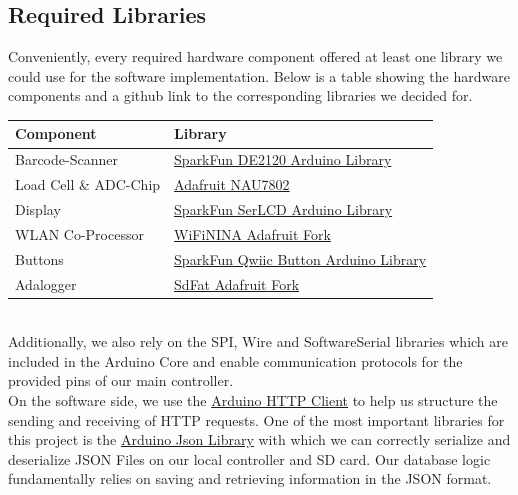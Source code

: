\documentclass{article}
\begin{document}
\subsection{Required Libraries}
Conveniently, every required hardware component offered at least one library we could use for the software implementation. 
Below is a table showing the hardware components and a github link to the corresponding libraries we decided for.
\\[10pt]
\begin{tabular}{l l}
	\hline
	Component              & Library\\
	\hline
	Barcode-Scanner        & \href{https://github.com/sparkfun/SparkFun_DE2120_Arduino_Library}{SparkFun DE2120 Arduino Library}\\
	Load Cell \& ADC-Chip  & \href{https://github.com/adafruit/Adafruit_NAU7802}{Adafruit NAU7802}\\
	Display                & \href{https://github.com/sparkfun/SparkFun_SerLCD_Arduino_Library}{SparkFun SerLCD Arduino Library}\\
	WLAN Co-Processor      & \href{https://github.com/adafruit/WiFiNINA}{WiFiNINA Adafruit Fork}\\
	Buttons                & \href{https://github.com/sparkfun/SparkFun_Qwiic_Button_Arduino_Library}{SparkFun Qwiic Button Arduino Library}\\
	Adalogger              & \href{https://github.com/adafruit/SdFat}{SdFat Adafruit Fork}\\
	\hline
\end{tabular} \\[10pt]
Additionally, we also rely on the SPI, Wire and SoftwareSerial libraries which are included in the Arduino Core and enable communication protocols for the provided pins of our main controller. \\
On the software side, we use the \href{https://github.com/arduino-libraries/ArduinoHttpClient}{Arduino HTTP Client} to help us structure the sending and receiving of HTTP requests.
One of the most important libraries for this project is the \href{https://github.com/bblanchon/ArduinoJson}{Arduino Json Library} with which we can correctly serialize and deserialize JSON Files on our local controller and SD card.
Our database logic fundamentally relies on saving and retrieving information in the JSON format. \\
\end{document}
